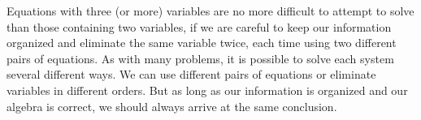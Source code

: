 \documentclass[12pt]{book}
\theoremstyle{definition}
\begin{document}
Equations with three (or more) variables are no more difficult to attempt to solve than those containing two variables, if we are careful to keep our information organized and eliminate the same variable twice, each time using two different pairs of equations. As with many problems, it is possible to solve each system several different ways. We can use different pairs of equations or eliminate variables in different orders.  But as long as our information is organized and our algebra is correct, we should always arrive at the same conclusion.
\end{document}
